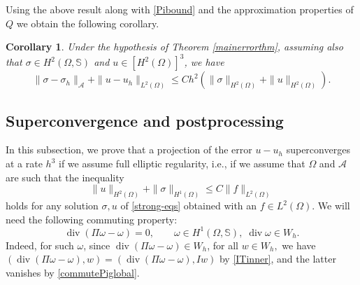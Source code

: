 \documentclass[12pt]{amsart}
\numberwithin{equation}{section}
\DeclareMathOperator{\divg}{div}
\newtheorem{corollary}[theorem]{Corollary}
\theoremstyle{definition}
\theoremstyle{remark}
\newcommand{\om}{{\Omega}}
\renewcommand{\(}{\bigl(}
\renewcommand{\)}{\bigr)}
\newcommand{\Aa}{\mathcal{A}}
\begin{document}
Using the above result along with \eqref{Pibound} and the approximation properties of $Q$ we obtain the following corollary.
\begin{corollary}
  \label{cor:errorin-sig_u}
Under the hypothesis of Theorem \ref{mainerrorthm}, assuming also that $\sigma \in H^2(\Omega, \mathbb{S})$ and $u \in [H^2(\Omega)]^3$, we have 
\begin{equation}
  \|\sigma-\sigma_h\|_{\Aa}
  + \|u-u_h\|_{L^2(\Omega)}
  \le C  h^2 (\|\sigma\|_{H^2(\Omega)}+ \|u\|_{H^2(\Omega)}).
\end{equation}
\end{corollary}

\subsection{Superconvergence and postprocessing}
In this subsection, we prove that a projection of the error $u-u_h$ superconverges at a rate
$h^3$ if we assume full elliptic regularity, i.e., if we assume that $\om$ and $\Aa$ are such that the inequality
\begin{equation}
  \label{eq:full-reg}
  \| u \|_{H^2(\om)} + \| \sigma \|_{H^1(\om)} \le C \| f \|_{L^2(\om)}
\end{equation}
holds for any solution $\sigma, u$ of \eqref{strong-eqs} obtained with an 
$f \in L^2(\om)$.
We will need the
following commuting property:
\begin{equation}\label{commutePiglobalw}
  \divg(\Pi \omega -\omega) = 0,
  \qquad 
  \omega \in    H^1(\Omega, \mathbb{S}), \;
  \divg \omega \in W_h. 
\end{equation}
Indeed, for such $\omega$, since  $\divg(\Pi \omega -\omega) \in W_h$, for all $w \in W_h,$
we have   $( \divg(\Pi \omega -\omega),  w) =( \divg(\Pi \omega -\omega),  I w)$ by \eqref{ITinner}, and the latter vanishes by \eqref{commutePiglobal}.
\end{document}
